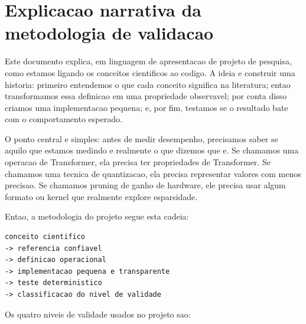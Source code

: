 

\chapter{Explicacao narrativa da metodologia de validacao}








Este documento explica, em linguagem de apresentacao de projeto de pesquisa, como estamos ligando os conceitos cientificos ao codigo. A ideia e construir uma historia: primeiro entendemos o que cada conceito significa na literatura; entao transformamos essa definicao em uma propriedade observavel; por conta disso criamos uma implementacao pequena; e, por fim, testamos se o resultado bate com o comportamento esperado.








O ponto central e simples: antes de medir desempenho, precisamos saber se aquilo que estamos medindo e realmente o que dizemos que e. Se chamamos uma operacao de Transformer, ela precisa ter propriedades de Transformer. Se chamamos uma tecnica de quantizacao, ela precisa representar valores com menos precisao. Se chamamos pruning de ganho de hardware, ele precisa usar algum formato ou kernel que realmente explore esparsidade.



Entao, a metodologia do projeto segue esta cadeia:



\begin{Verbatim}[fontsize=\small,breaklines=true,label=text]
conceito cientifico
-> referencia confiavel
-> definicao operacional
-> implementacao pequena e transparente
-> teste deterministico
-> classificacao do nivel de validade
\end{Verbatim}



Os quatro niveis de validade usados no projeto sao:



